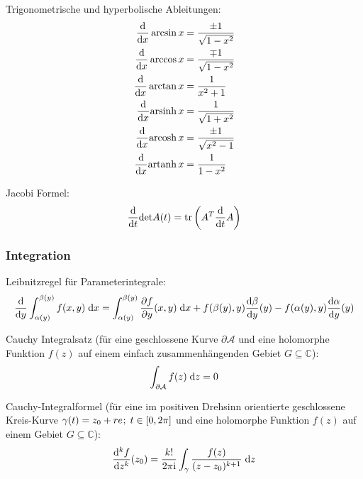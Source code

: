 			\noindent
			Trigonometrische und hyperbolische Ableitungen:
			\begin{equation}
				\begin{split}
					\frac{\mathrm{d}}{\mathrm{d} x}\arcsin x &= \frac{\pm 1}{\sqrt{1-x^2}} \\
					\frac{\mathrm{d}}{\mathrm{d} x}\arccos x &= \frac{\mp 1}{\sqrt{1-x^2}} \\
					\frac{\mathrm{d}}{\mathrm{d} x}\arctan x &= \frac{1}{x^2+1} \\
					\frac{\mathrm{d}}{\mathrm{d} x}\mathrm{arsinh}\,x &= \frac{1}{\sqrt{1+x^2}} \\
					\frac{\mathrm{d}}{\mathrm{d} x}\mathrm{arcosh}\,x &= \frac{\pm 1}{\sqrt{x^2-1}} \\
					\frac{\mathrm{d}}{\mathrm{d} x}\mathrm{artanh}\,x &= \frac{1}{1-x^2} \\
				\end{split}
			\end{equation}

			\noindent
			Jacobi Formel:
			\begin{equation}
				\frac{\mathrm{d} }{\mathrm{d} t}\mathrm{det} A(t) = \mathrm{tr}\left(A^T \frac{\mathrm{d} }{\mathrm{d} t} A\right)
			\end{equation}

		\subsubsection{Integration}
			\noindent
			Leibnitzregel für Parameterintegrale:
			\begin{equation}
				\frac{\mathrm{d} }{\mathrm{d} y} \int_{\alpha(y)}^{\beta(y)}f(x,y)\;\mathrm{d} x = \int_{\alpha(y)}^{\beta(y)} \frac{\partial f}{\partial y}(x,y)\;\mathrm{d} x + f(\beta(y),y)\frac{\mathrm{d} \beta}{\mathrm{d} y}(y)-f(\alpha(y),y)\frac{\mathrm{d} \alpha}{\mathrm{d} y}(y)
			\end{equation}

			\noindent
			Cauchy Integralsatz (für eine geschlossene Kurve $\partial \mathcal{A}$ und eine holomorphe Funktion $f(z)$ auf einem einfach zusammenhängenden Gebiet $G \subseteq \mathbb{C}$):
			\begin{equation}
				\int_{\partial \mathcal{A}} f(z)\;\mathrm{d} z = 0
			\end{equation}

			\noindent
			Cauchy-Integralformel (für eine im positiven Drehsinn orientierte geschlossene Kreis-Kurve $\gamma(t)=z_0+re^{\it};\;t\in[0,2\pi]$ und eine holomorphe Funktion $f(z)$ auf einem Gebiet $G \subseteq \mathbb{C}$):
			\begin{equation}
				\frac{\mathrm{d}^k f}{\mathrm{d} z^k}(z_0) = \frac{k!}{2\pi \mathrm{i}} \int_\gamma \frac{f(z)}{(z-z_0)^{k+1}}\;\mathrm{d} z
			\end{equation}

